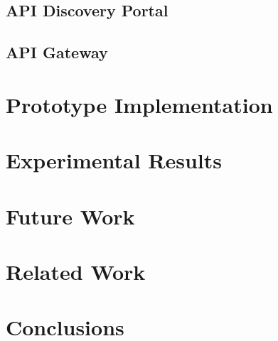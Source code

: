 \documentclass[conference]{acm_proc_article-sp}
\begin{document}
\subsection{API Discovery Portal}
\subsection{API Gateway}

\section{Prototype Implementation}

\section{Experimental Results}
\label{sec:results}


%

\section{Future Work}
%

\section{Related Work}
%

\section{Conclusions}
%



\end{document}
